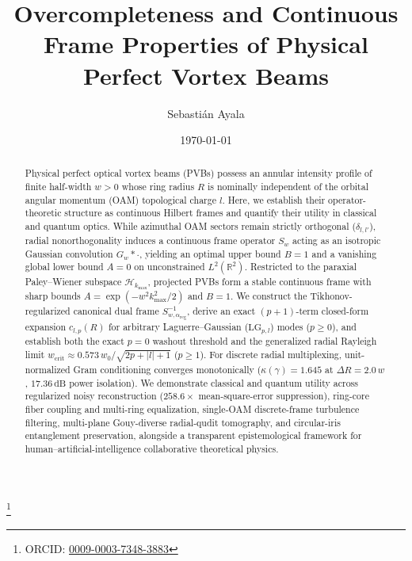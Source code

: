 \documentclass[aps,pra,onecolumn,notitlepage,11pt,tightenlines,amsmath,amssymb,floatfix,longbibliography]{revtex4-2}
\providecommand{\abs}[1]{\lvert#1\rvert}
\begin{document}
\title{Overcompleteness and Continuous Frame Properties of Physical Perfect Vortex Beams}

\author{Sebasti\'an Ayala}
\thanks{ORCID: \href{https://orcid.org/0009-0003-7348-3883}{0009-0003-7348-3883}}

\date{\today}

\begin{abstract}
Physical perfect optical vortex beams (PVBs) possess an annular intensity profile of finite half-width $w > 0$ whose ring radius $R$ is nominally independent of the orbital angular momentum (OAM) topological charge $l$. Here, we establish their operator-theoretic structure as continuous Hilbert frames and quantify their utility in classical and quantum optics. While azimuthal OAM sectors remain strictly orthogonal ($\delta_{l,l'}$), radial nonorthogonality induces a continuous frame operator $S_w$ acting as an isotropic Gaussian convolution $G_w * \cdot$, yielding an optimal upper bound $B = 1$ and a vanishing global lower bound $A = 0$ on unconstrained $L^2(\mathbb{R}^2)$. Restricted to the paraxial Paley--Wiener subspace $\mathcal{H}_{k_{\max}}$, projected PVBs form a stable continuous frame with sharp bounds $A = \exp(-w^2 k_{\max}^2/2)$ and $B = 1$. We construct the Tikhonov-regularized canonical dual frame $S_{w,\alpha_{\mathrm{reg}}}^{-1}$, derive an exact $(p+1)$-term closed-form expansion $c_{l,p}(R)$ for arbitrary Laguerre--Gaussian ($\mathrm{LG}_{p,l}$) modes ($p \ge 0$), and establish both the exact $p=0$ washout threshold and the generalized radial Rayleigh limit $w_{\mathrm{crit}} \approx 0.573\,w_0/\sqrt{2p+\abs{l}+1}$ ($p \ge 1$). For discrete radial multiplexing, unit-normalized Gram conditioning converges monotonically ($\kappa(\gamma) = 1.645$ at $\Delta R = 2.0\,w$, $17.36\,\mathrm{dB}$ power isolation). We demonstrate classical and quantum utility across regularized noisy reconstruction ($258.6\times$ mean-square-error suppression), ring-core fiber coupling and multi-ring equalization, single-OAM discrete-frame turbulence filtering, multi-plane Gouy-diverse radial-qudit tomography, and circular-iris entanglement preservation, alongside a transparent epistemological framework for human--artificial-intelligence collaborative theoretical physics.
\end{abstract}

\maketitle
\end{document}
